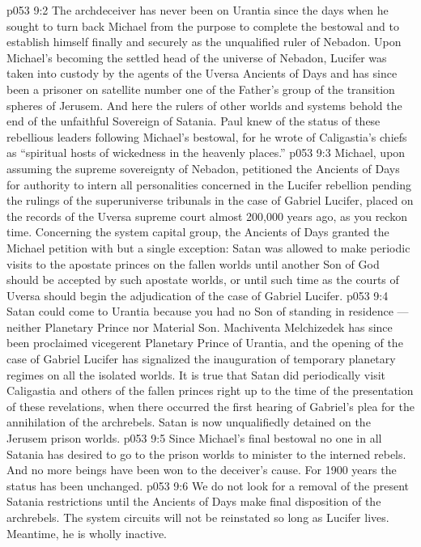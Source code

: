 \vs p053 9:2 \pc The archdeceiver has never been on Urantia since the days when he sought to turn back Michael from the purpose to complete the bestowal and to establish himself finally and securely as the unqualified ruler of Nebadon. Upon Michael’s becoming the settled head of the universe of Nebadon, Lucifer was taken into custody by the agents of the Uversa Ancients of Days and has since been a prisoner on satellite number one of the Father’s group of the transition spheres of Jerusem. And here the rulers of other worlds and systems behold the end of the unfaithful Sovereign of Satania. Paul knew of the status of these rebellious leaders following Michael’s bestowal, for he wrote of Caligastia’s chiefs as “spiritual hosts of wickedness in the heavenly places.”
\vs p053 9:3 \pc Michael, upon assuming the supreme sovereignty of Nebadon, petitioned the Ancients of Days for authority to intern all personalities concerned in the Lucifer rebellion pending the rulings of the superuniverse tribunals in the case of Gabriel  Lucifer, placed on the records of the Uversa supreme court almost 200,000 years ago, as you reckon time. Concerning the system capital group, the Ancients of Days granted the Michael petition with but a single exception: Satan was allowed to make periodic visits to the apostate princes on the fallen worlds until another Son of God should be accepted by such apostate worlds, or until such time as the courts of Uversa should begin the adjudication of the case of Gabriel  Lucifer.
\vs p053 9:4 Satan could come to Urantia because you had no Son of standing in residence --- neither Planetary Prince nor Material Son. Machiventa Melchizedek has since been proclaimed vicegerent Planetary Prince of Urantia, and the opening of the case of Gabriel  Lucifer has signalized the inauguration of temporary planetary regimes on all the isolated worlds. It is true that Satan did periodically visit Caligastia and others of the fallen princes right up to the time of the presentation of these revelations, when there occurred the first hearing of Gabriel’s plea for the annihilation of the archrebels. Satan is now unqualifiedly detained on the Jerusem prison worlds.
\vs p053 9:5 \pc Since Michael’s final bestowal no one in all Satania has desired to go to the prison worlds to minister to the interned rebels. And no more beings have been won to the deceiver’s cause. For 1900 years the status has been unchanged.
\vs p053 9:6 We do not look for a removal of the present Satania restrictions until the Ancients of Days make final disposition of the archrebels. The system circuits will not be reinstated so long as Lucifer lives. Meantime, he is wholly inactive.
